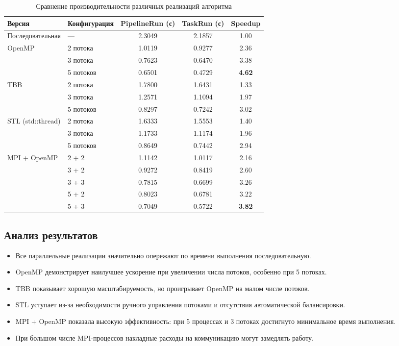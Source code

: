 \documentclass[14pt,a4paper]{extarticle}
\begin{document}
\renewcommand{\arraystretch}{1.3}
\begin{table}[H]
\centering
\footnotesize
\begin{tabularx}{\textwidth}{|l|l|c|c|c|}
\hline
\textbf{Версия} & \textbf{Конфигурация} & \textbf{PipelineRun (с)} & \textbf{TaskRun (с)} & \textbf{Speedup} \\
\hline
Последовательная & — & 2.3049 & 2.1857 & 1.00 \\
\hline
\multirow{3}{*}{OpenMP} 
  & 2 потока & 1.0119 & 0.9277 & 2.36 \\
  & 3 потока & 0.7623 & 0.6470 & 3.38 \\
  & 5 потоков & 0.6501 & 0.4729 & \textbf{4.62} \\
\hline
\multirow{3}{*}{TBB} 
  & 2 потока & 1.7800 & 1.6431 & 1.33 \\
  & 3 потока & 1.2571 & 1.1094 & 1.97 \\
  & 5 потоков & 0.8297 & 0.7242 & 3.02 \\
\hline
\multirow{3}{*}{STL (std::thread)} 
  & 2 потока & 1.6333 & 1.5553 & 1.40 \\
  & 3 потока & 1.1733 & 1.1174 & 1.96 \\
  & 5 потоков & 0.8649 & 0.7442 & 2.94 \\
\hline
\multirow{5}{*}{MPI + OpenMP} 
  & 2 + 2 & 1.1142 & 1.0117 & 2.16 \\
  & 3 + 2 & 0.9272 & 0.8419 & 2.60 \\
  & 3 + 3 & 0.7815 & 0.6699 & 3.26 \\
  & 5 + 2 & 0.8023 & 0.6781 & 3.22 \\
  & 5 + 3 & 0.7049 & 0.5722 & \textbf{3.82} \\
\hline
\end{tabularx}
\caption{Сравнение производительности различных реализаций алгоритма}
\end{table}

\subsection{Анализ результатов}

\begin{itemize}
    \item Все параллельные реализации значительно опережают по времени выполнения последовательную.
    \item OpenMP демонстрирует наилучшее ускорение при увеличении числа потоков, особенно при 5 потоках.
    \item TBB показывает хорошую масштабируемость, но проигрывает OpenMP на малом числе потоков.
    \item STL уступает из-за необходимости ручного управления потоками и отсутствия автоматической балансировки.
    \item MPI + OpenMP показала высокую эффективность: при 5 процессах и 3 потоках достигнуто минимальное время выполнения.
    \item При большом числе MPI-процессов накладные расходы на коммуникацию могут замедлять работу.
\end{itemize}
\end{document}
